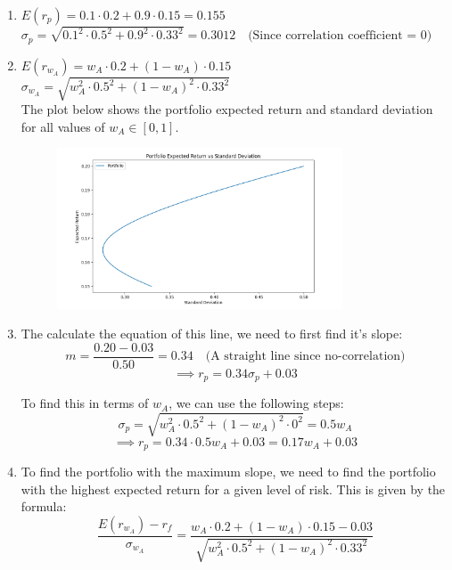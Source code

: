 \documentclass[a4paper]{article}
\begin{document}
\begin{enumerate}[label=(\alph*)]
    \item $E(r_p) = 0.1 \cdot 0.2 + 0.9 \cdot 0.15 = 0.155$ \\

    $\sigma_p = \sqrt{0.1^2 \cdot 0.5^2 + 0.9^2 \cdot 0.33^2} = 0.3012 \quad \text{(Since correlation coefficient = 0)}$

    \vspace{5mm}
    \item $E(r_{w_A}) = w_A \cdot 0.2 + (1 - w_A) \cdot 0.15$ \\
    $\sigma_{w_A} = \sqrt{w_A^2 \cdot 0.5^2 + (1 - w_A)^2 \cdot 0.33^2}$ \\

    The plot below shows the portfolio expected return and standard deviation for all values of $w_A \in [0, 1]$.
    \begin{figure}[ht]
        \centering
        \includegraphics[width=0.8\textwidth]{q7.png}
    \end{figure}

    \vspace{5mm}
    \item The calculate the equation of this line, we need to first find it's slope:
    \[
        m = \frac{0.20 - 0.03}{0.50} = 0.34 \quad \text{(A straight line since no-correlation)}
    \]
    \[
        \implies r_p = 0.34 \sigma_p + 0.03
    \]

    To find this in terms of $w_A$, we can use the following steps:
    \[
        \sigma_p = \sqrt{w_A^2 \cdot 0.5^2 + (1 - w_A)^2 \cdot 0^2} = 0.5w_A
    \]
    \[
        \implies r_p = 0.34 \cdot 0.5w_A + 0.03 = 0.17w_A + 0.03
    \]

    \vspace{5mm}
    \item To find the portfolio with the maximum slope, we need to find the portfolio with the highest expected return for a given level of risk. This is given by the formula:
    \[
        \frac{E(r_{w_A}) - r_f}{\sigma_{w_A}} = \frac{w_A \cdot 0.2 + (1 - w_A) \cdot 0.15 - 0.03}{\sqrt{w_A^2 \cdot 0.5^2 + (1 - w_A)^2 \cdot 0.33^2}}
    \]


\end{enumerate}
\end{document}
